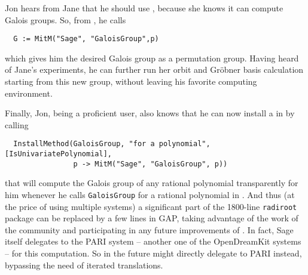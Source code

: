 Jon hears from Jane that he should use \Sage, because she knows it can
compute Galois groups. So, from \GAP, he calls
\begin{lstlisting}
  G := MitM("Sage", "GaloisGroup",p)
\end{lstlisting}
which gives him the desired
Galois group as a \GAP permutation group. Having heard of Jane's
experiments, he can further run her orbit and Gröbner basis
calculation starting from this new group, without leaving his
favorite computing environment.

Finally, Jon, being a proficient \GAP user, also knows that he can now install a  in \GAP by calling 
\begin{lstlisting}
  InstallMethod(GaloisGroup, "for a polynomial", [IsUnivariatePolynomial], 
                p -> MitM("Sage", "GaloisGroup", p))
\end{lstlisting}
that will compute the Galois group of any rational polynomial transparently for him whenever he calls \lstinline|GaloisGroup| for a rational polynomial in \GAP. 
And thus (at the price of using multiple systems) a significant part of the 1800-line \lstinline|radiroot| package can be replaced by a few lines in GAP, taking advantage of the work of the \Sage community and participating in any future improvements of \Sage. 
In fact, Sage itself delegates to the PARI system -- another one of the OpenDreamKit systems -- for this computation.  So in the future \GAP might directly delegate to PARI instead, bypassing the need of iterated translations.



